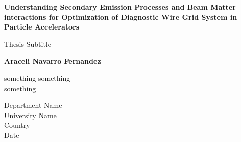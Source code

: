 \begin{titlepage}
    \begin{center}
        
        \vspace*{1cm}
        \Large
        \textbf{Understanding Secondary Emission Processes and Beam Matter interactions for Optimization of Diagnostic Wire Grid System in Particle Accelerators}
        
        \vspace{0.5cm}
        \LARGE
        Thesis Subtitle

        \vspace{1.5cm}
        \large
        \textbf{Araceli Navarro Fernandez}

        \vfill

        something something  \\
        something

        \vspace{0.8cm}
        \large
        Department Name \\
        University Name \\
        Country \\
        Date


    \end{center}
\end{titlepage}